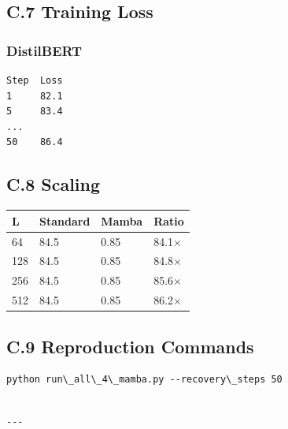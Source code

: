 \subsection{C.7 Training Loss}

\subsubsection{DistilBERT}
\begin{lstlisting}
Step  Loss
1     82.1
5     83.4
...
50    86.4
\end{lstlisting}

\subsection{C.8 Scaling}

\begin{table}[H]
\centering
\small
\begin{tabular}{llll}
\toprule
\textbf{L} & \textbf{Standard} & \textbf{Mamba} & \textbf{Ratio} \\
\midrule
64 & 84.5 & 0.85 & 84.1$\times$ \\
128 & 84.5 & 0.85 & 84.8$\times$ \\
256 & 84.5 & 0.85 & 85.6$\times$ \\
512 & 84.5 & 0.85 & 86.2$\times$ \\
\bottomrule
\end{tabular}
\end{table}

\subsection{C.9 Reproduction Commands}

\begin{lstlisting}
python run\_all\_4\_mamba.py --recovery\_steps 50
\end{lstlisting}
\begin{lstlisting}

---
\end{lstlisting}